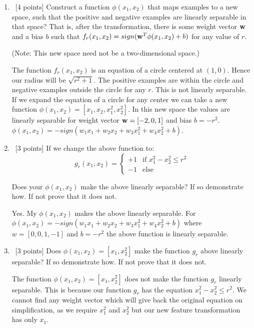 \begin{enumerate}
\item ~[4 points] Construct a function $\phi(x_1,x_2)$ that maps
  examples to a new space, such that the positive and negative
  examples are linearly separable in that space? That is, after the
  transformation, there is some weight vector ${\bf w}$ and a bias $b$
  such that $f_r(x_1, x_2) = sign({\bf w}^T\phi(x_1, x_2) + b)$ for any
  value of $r$.

  (Note: This new space need not be a two-dimensional space.)
\begin{solution}
The function $f_r(x_1, x_2)$ is an equation of a circle centered at $(1,0)$. Hence our radius will be $\sqrt{r^2+1}$. The positive examples are within the circle and negative examples outside the circle for any $r$. This is not linearly separable. If we expand the equation of a circle for any center we can take a new function $\phi(x_1, x_2) = [x_1,x_2,x_1^2,x_2^2]$. In this new space the values are linearly separable for weight vector ${\bf w} = \left[-2,0,1\right]$ and bias $b = -r^2$. $\phi(x_1,x_2) = -sign(w_1 x_1 + w_2 x_2 + w_3 x_1^2 + w_4 x_2^2 + b)$.
\end{solution}
\item ~[3 points] If we change the above function to: 
  \[
  g_r(x_1,x_2) = 
  \begin{cases}
    +1 & \text{if } x_1^2 -x_2^2 \leq r^2 \\
    -1 & \text{else}
  \end{cases}
  \]

  Does your $\phi(x_1,x_2)$ make the above linearly separable?  If so
  demonstrate how. If not prove that it does not.
\begin{solution}
Yes. My $\phi(x_1,x_2)$ makes the above linearly separable. For $\phi(x_1,x_2) = -sign(w_1 x_1 + w_2 x_2 + w_3 x_1^2 + w_4 x_2^2 + b)$ where
 $w = [0,0,1,-1]$ and $b = -r^2$ the above function is linearly separable.
\end{solution}
\item ~[3 points] Does $\phi(x_1,x_2) = [x_1,x_2^2]$ make the function
  $g_r$ above linearly separable? If so demonstrate how. If not prove
  that it does not.
\begin{solution}
The function $\phi(x_1,x_2) = [x_1,x_2^2]$ does not make the function $g_r$ linearly separable. This is because our function $g_r$ has the equation $x_1^2 - x_2^2 \leq r^2$. We cannot find any weight vector which will give back the original equation on simplification, as we require $x_1^2$ and $x_2^2$ but our new feature transformation has only $x_1$.
\end{solution}
\end{enumerate}



